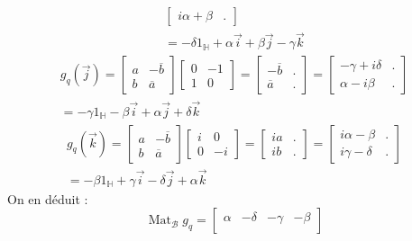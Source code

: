 \begin{enumerate}
\begin{enumerate}
\begin{multline*}
\begin{bmatrix}
 i\alpha + \beta & .
\end{bmatrix}
 \\
 = -\delta 1_{\mathbb{H}} + \alpha \overrightarrow{i} + \beta \overrightarrow{j}  -\gamma \overrightarrow{k}
\end{multline*}
\begin{multline*}
 g_q(\overrightarrow{j}) = 
 \begin{bmatrix}
a  & -\overline{b} \\
b  & \overline{a}
\end{bmatrix}
\begin{bmatrix}
0  & -1 \\
1  & 0 
\end{bmatrix}
=
\begin{bmatrix}
 -\overline{b} & . \\
 \overline{a} &  .
\end{bmatrix}
=
\begin{bmatrix}
 -\gamma +i\delta & . \\
 \alpha -i\beta & .
\end{bmatrix}
 \\
 = -\gamma 1_{\mathbb{H}} - \beta \overrightarrow{i} + \alpha \overrightarrow{j} + \delta \overrightarrow{k}
\end{multline*}
\begin{multline*}
 g_q(\overrightarrow{k}) = 
 \begin{bmatrix}
a  & -\overline{b} \\
b  & \overline{a}
\end{bmatrix}
\begin{bmatrix}
i  & 0 \\
0  & -i 
\end{bmatrix}
=
\begin{bmatrix}
 ia & . \\
 ib &  .
\end{bmatrix}
=
\begin{bmatrix}
 i\alpha -\beta & . \\
 i\gamma - \delta & .
\end{bmatrix}
 \\
 = -\beta 1_{\mathbb{H}} + \gamma \overrightarrow{i} - \delta \overrightarrow{j} + \alpha \overrightarrow{k}
\end{multline*}
On en déduit :
\begin{displaymath}
 \mathop{\mathrm{Mat}}_{\mathcal B}g_q = 
\begin{bmatrix}
 \alpha & -\delta & -\gamma & -\beta \\

\end{bmatrix}
\end{displaymath}
\end{enumerate}
\end{enumerate}
